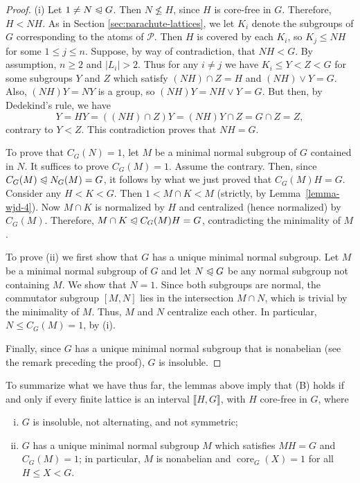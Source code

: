 \documentclass{gen-j-l}
\newcommand{\lb}{\ensuremath{\llbracket}}
\newcommand{\rb}{\ensuremath{\rrbracket}}
\newcommand{\<}{\ensuremath{\langle}}
\renewcommand{\>}{\ensuremath{\rangle}}
\theoremstyle{plain}
\theoremstyle{definition}
\theoremstyle{remark}
\numberwithin{theorem}{section}
\numberwithin{claim}{section}
\numberwithin{equation}{section}
\numberwithin{conjecture}{section}
\renewcommand{\leq}{\ensuremath{\leqslant}}
\renewcommand{\nleq}{\ensuremath{\nleqslant}}
\renewcommand{\geq}{\ensuremath{\geqslant}}
\newcommand{\subnormal}{\ensuremath{\trianglelefteqslant}}
\newcommand{\join}{\ensuremath{\vee}}
\newcommand{\core}{\ensuremath{\operatorname{core}}}
\newcommand{\2}{\ensuremath{\mathbf{2}}}
\newcommand{\3}{\ensuremath{\mathbf{3}}}
\newcommand{\sP}{\ensuremath{\mathscr{P}}}
\begin{document}
\begin{proof}
(i)
Let $1\neq N \subnormal G$.  Then $N \nleq H$, since $H$ is core-free in $G$.
Therefore, $H < NH$.   As in Section \ref{sec:parachute-lattices}, we let $K_i$
denote the subgroups of $G$ 
corresponding to the atoms of $\sP$.  
Then $H$ is covered by each $K_i$, so $K_j\leq NH$ for some $1\leq j\leq n$.  
Suppose, by way of contradiction, that $NH < G$.  
By assumption, $n\geq 2$ and $|L_i|>2$.  Thus for any $i\neq j$ we have
$K_i\leq Y < Z < G$ for some subgroups $Y$ and $Z$ which satisfy
$(NH)\cap Z = H$ and $(NH)\join Y = G$.  Also, $(NH)Y = NY$ is a group, so
$(NH)Y=NH\join Y = G$.  But then, by Dedekind's rule, we have
\[
Y = HY = ((NH)\cap Z) Y = (NH)Y \cap Z = G\cap Z = Z,
\]
contrary to $Y<Z$.  This contradiction proves that $NH = G$.

To prove that $C_G(N)=1$, let $M$ be a minimal normal subgroup of $G$
contained in $N$.  It suffices to prove $C_G(M)= 1$.
Assume the contrary. Then, 
since $C_G(M) \subnormal N_G(M) =G$, it follows by
what we just proved that $C_G(M)H = G$.
Consider any $H< K < G$. Then $1 < M\cap K < M$ (strictly, by
Lemma~\ref{lemma-wjd-4}). Now $M\cap K$ is normalized by $H$ and centralized
(hence normalized) by $C_G(M)$.  
Therefore, $M\cap K \subnormal C_G(M)H = G$, contradicting the minimality of
$M$.  

To prove (ii) we first show that $G$ has a unique minimal normal subgroup.  Let
$M$ be a minimal
normal subgroup of $G$ and let $N \subnormal G$ be any normal subgroup not 
containing $M$.  We show that $N = 1$.  Since both subgroups
are normal, the commutator subgroup
$[M,N]$
lies in the intersection $M\cap N$, which is trivial by the minimality of $M$.   
Thus, $M$ and $N$ centralize each other.  In particular,
$N \leq C_G(M) = 1$, by (i).

Finally, since $G$ has a unique
minimal normal subgroup that is nonabelian 
(see the remark preceding the proof),
$G$ is insoluble.
\end{proof}

To summarize what we have thus far, the lemmas above imply that (B) holds if and only if
every finite lattice is an interval $\lb H, G \rb$, with $H$ core-free in $G$, where
\begin{enumerate}[(i)]
\item $G$ is insoluble, not alternating, and not symmetric;
\item $G$ has a unique minimal normal subgroup $M$ which satisfies $MH = G$
and $C_G(M) = 1$; in particular,
$M$ is nonabelian and $\core_G(X) = 1$ for all $H\leq X < G$.
\end{enumerate}
\end{document}
